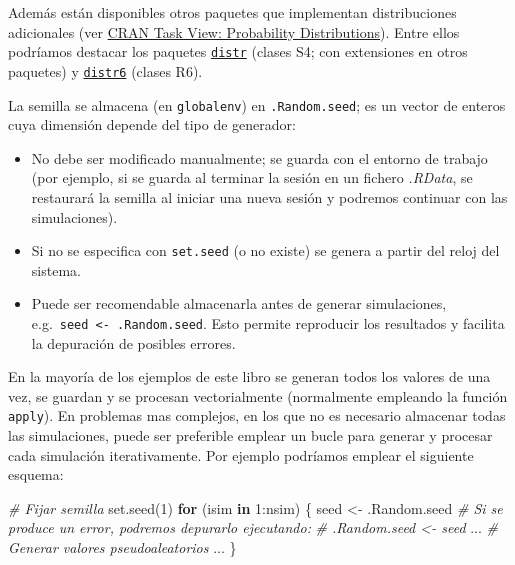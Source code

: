 \documentclass[
]{book}
\newenvironment{Shaded}{\begin{snugshade}}{\end{snugshade}}
\newcommand{\CommentTok}[1]{\textcolor[rgb]{0.56,0.35,0.01}{\textit{#1}}}
\newcommand{\ControlFlowTok}[1]{\textcolor[rgb]{0.13,0.29,0.53}{\textbf{#1}}}
\newcommand{\DecValTok}[1]{\textcolor[rgb]{0.00,0.00,0.81}{#1}}
\newcommand{\FunctionTok}[1]{\textcolor[rgb]{0.00,0.00,0.00}{#1}}
\newcommand{\NormalTok}[1]{#1}
\newcommand{\OtherTok}[1]{\textcolor[rgb]{0.56,0.35,0.01}{#1}}
\newcommand{\SpecialCharTok}[1]{\textcolor[rgb]{0.00,0.00,0.00}{#1}}
\theoremstyle{break}
\theoremstyle{definition}
\theoremstyle{definition}
\theoremstyle{definition}
\theoremstyle{definition}
\theoremstyle{remark}
\begin{document}
Además están disponibles otros paquetes que implementan distribuciones adicionales (ver \href{https://cran.r-project.org/view=Distributions}{CRAN Task View: Probability Distributions}).
Entre ellos podríamos destacar los paquetes \href{http://distr.r-forge.r-project.org}{\texttt{distr}} (clases S4; con extensiones en otros paquetes) y \href{https://alan-turing-institute.github.io/distr6/index.html}{\texttt{distr6}} (clases R6).

La semilla se almacena (en \texttt{globalenv}) en \texttt{.Random.seed}; es un vector
de enteros cuya dimensión depende del tipo de generador:

\begin{itemize}
\item
  No debe ser modificado manualmente; se guarda con el entorno de trabajo (por ejemplo, si se guarda al terminar la sesión en un fichero \emph{.RData}, se restaurará la semilla al iniciar una nueva sesión y podremos continuar con las simulaciones).
\item
  Si no se especifica con \texttt{set.seed} (o no existe) se genera a partir del reloj del sistema.
\item
  Puede ser recomendable almacenarla antes de generar simulaciones, e.g.~\texttt{seed\ \textless{}-\ .Random.seed}.
  Esto permite reproducir los resultados y facilita la depuración de posibles errores.
\end{itemize}

En la mayoría de los ejemplos de este libro se generan todos los valores de una vez,
se guardan y se procesan vectorialmente (normalmente empleando la función \texttt{apply}).
En problemas mas complejos, en los que no es necesario almacenar todas las simulaciones,
puede ser preferible emplear un bucle para generar y procesar cada simulación iterativamente.
Por ejemplo podríamos emplear el siguiente esquema:

\begin{Shaded}
\begin{Highlighting}[]
\CommentTok{\# Fijar semilla}
\FunctionTok{set.seed}\NormalTok{(}\DecValTok{1}\NormalTok{)}
\ControlFlowTok{for}\NormalTok{ (isim }\ControlFlowTok{in} \DecValTok{1}\SpecialCharTok{:}\NormalTok{nsim) \{}
\NormalTok{  seed }\OtherTok{\textless{}{-}}\NormalTok{ .Random.seed}
  \CommentTok{\# Si se produce un error, podremos depurarlo ejecutando:}
  \CommentTok{\#  .Random.seed \textless{}{-} seed}
\NormalTok{  ...}
  \CommentTok{\# Generar valores pseudoaleatorios}
\NormalTok{  ...}
\NormalTok{\}}
\end{Highlighting}
\end{Shaded}
\end{document}
